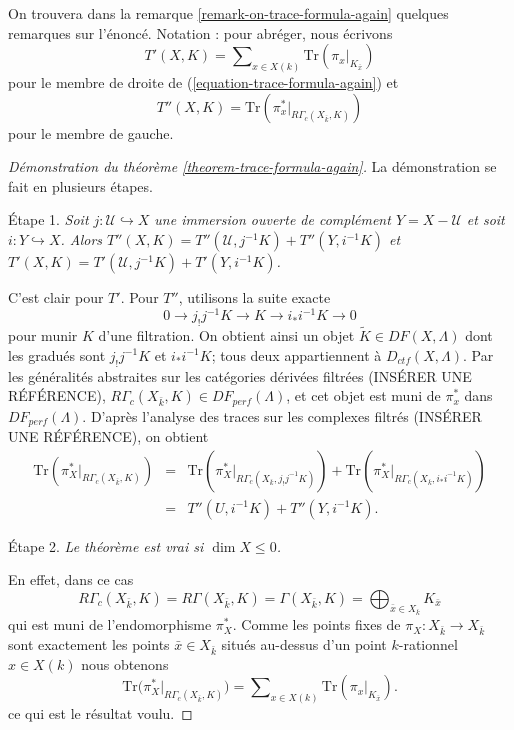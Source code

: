 \noindent
On trouvera dans la remarque \ref{remark-on-trace-formula-again} quelques remarques
sur l'énoncé. Notation : pour abréger, nous écrivons
$$
T'(X, K) =
\sum\nolimits_{x\in X(k)}
\text{Tr}(\pi_x |_{K_{\bar x}})
$$
pour le membre de droite de (\ref{equation-trace-formula-again}) et
$$
T''(X, K)
=\text{Tr}(\pi_x^* |_{R\Gamma_c(X_{\bar k}, K)})
$$
pour le membre de gauche.

\begin{proof}[Démonstration du théorème \ref{theorem-trace-formula-again}]
La démonstration se fait en plusieurs étapes.

\medskip\noindent
Étape 1. {\it Soit $j : \mathcal{U}\hookrightarrow X$ une immersion ouverte de
complément $Y = X - \mathcal{U}$ et soit $i : Y \hookrightarrow X$. Alors
$T''(X, K) = T''(\mathcal{U}, j^{-1} K)+ T''(Y, i^{-1}K)$ et
$T'(X, K) = T'(\mathcal{U}, j^{-1} K)+ T'(Y, i^{-1}K)$.}

\medskip\noindent
C'est clair pour $T'$. Pour $T''$, utilisons la suite exacte
$$
0\to j_!j^{-1} K \to K \to i_* i^{-1} K \to 0
$$
pour munir $K$ d'une filtration. On obtient ainsi un objet
$\widetilde K \in DF(X, \Lambda)$
dont les gradués sont $j_!j^{-1}K$ et $i_*i^{-1}K$;
tous deux appartiennent à $D_{ctf}(X, \Lambda)$. Par les généralités abstraites sur les catégories dérivées filtrées
(INSÉRER UNE RÉFÉRENCE),
$R\Gamma_c(X_{\bar k}, K)\in DF_{perf}(\Lambda)$,
et cet objet est muni de $\pi_x^*$ dans
$DF_{perf}(\Lambda)$.
D'après l'analyse des traces sur les complexes filtrés (INSÉRER UNE RÉFÉRENCE), on obtient
\begin{eqnarray*}
\text{Tr}(\pi_X^* |_{R\Gamma_c(X_{\bar k}, K)})
& = & \text{Tr}(\pi_X^* |_{R\Gamma_c(X_{\bar k}, j_!j^{-1}K)}) +
\text{Tr}(\pi_X^* |_{R\Gamma_c(X_{\bar k}, i_*i^{-1}K)}) \\
& = & T''(U, i^{-1}K) + T''(Y, i^{-1}K).
\end{eqnarray*}

\noindent
Étape 2. {\it Le théorème est vrai si $\dim X\leq 0$. }

\medskip\noindent
En effet, dans ce cas
$$
R\Gamma_c(X_{\bar k}, K) = R\Gamma(X_{\bar k}, K) = \Gamma(X_{\bar k}, K) =
\bigoplus\nolimits_{\bar x \in X_{\bar k}} K_{\bar x}
$$
qui est muni de l'endomorphisme $\pi_X^*$.
Comme les points fixes de $\pi_X : X_{\bar k}\to X_{\bar k}$ sont exactement les
points $\bar x \in X_{\bar k}$ situés au-dessus d'un point $k$-rationnel $x \in X(k)$
nous obtenons
$$
\text{Tr}\big(\pi_X^*|_{R\Gamma_c(X_{\bar k}, K)}\big) =
\sum\nolimits_{x \in X(k)} \text{Tr}(\pi_x|_{K_{\bar x}}).
$$
ce qui est le résultat voulu.


\end{proof}
